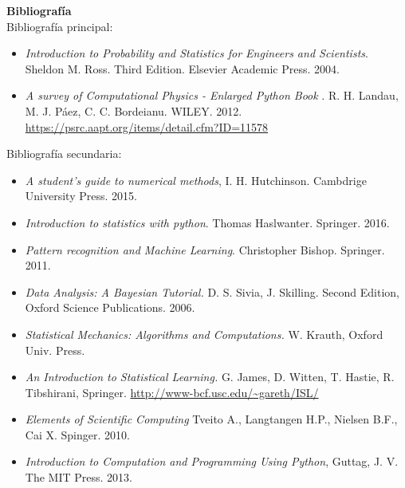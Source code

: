 \documentclass[letterpaper,10pt,onecolumn]{article}
\begin{document}
\vspace*{0.5cm} 

\noindent\textbf{\large {} \quad
  Bibliograf\'ia}\\[-0.2cm] 



\noindent\normalsize Bibliograf\'ia principal:

\begin{itemize}

\item \textit{Introduction to Probability and Statistics for Engineers and
  Scientists}. Sheldon M. Ross. Third Edition. Elsevier Academic
  Press. 2004.

\item
\textit{A survey of Computational Physics - Enlarged Python Book}
. R. H. Landau, M. J. P\'aez, C. C. Bordeianu. WILEY. 2012.
\url{https://psrc.aapt.org/items/detail.cfm?ID=11578}




\end{itemize}

\noindent\normalsize Bibliograf\'ia secundaria:

\begin{itemize}

\item 
\textit{A student's guide to numerical methods},
I. H. Hutchinson. Cambdrige University Press. 2015.
\item
\textit{Introduction to statistics with python}.
Thomas Haslwanter.  Springer. 2016.

\item 
\textit{Pattern recognition and Machine Learning}.
Christopher Bishop. Springer. 2011.

\item
\textit{Data Analysis: A Bayesian Tutorial.} D. S. Sivia,
J. Skilling. Second Edition, Oxford Science Publications. 2006.

\item 
\textit{Statistical Mechanics: Algorithms and Computations.}
W. Krauth, Oxford Univ. Press. 

\item
\textit{An Introduction to Statistical Learning.} G. James, D. Witten,
T. Hastie, R. Tibshirani,
Springer. \url{http://www-bcf.usc.edu/~gareth/ISL/} 


\item
\textit{Elements of Scientific Computing}
Tveito A., Langtangen H.P., Nielsen B.F., Cai X. Spinger. 2010.

\item 
\textit{Introduction to Computation and Programming Using Python},
Guttag, J. V. The MIT Press. 2013.

\end{itemize}
\end{document}

